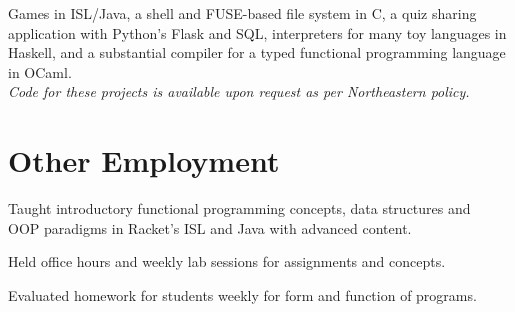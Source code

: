 \documentclass[letterpaper]{deedy-resume} %
\begin{document}
\begin{minipage}[t]{0.66\textwidth}
Games in ISL/Java,
a shell and FUSE-based file system in C,
a quiz sharing application with Python's Flask and SQL,
interpreters for many toy languages in Haskell,
and a substantial compiler for a typed functional programming language in OCaml. \\
\textit{Code for these projects is available upon request as per Northeastern policy.}


\section{Other Employment}

Taught introductory functional programming concepts, data structures and \\
OOP paradigms in Racket's ISL and Java with advanced content.
\begin{tightitemize}
\item Held office hours and weekly lab sessions for assignments and concepts.
\item Evaluated homework for students weekly for form and function of programs.
\end{tightitemize}

\sectionspace %

\end{minipage} %
\end{document}
